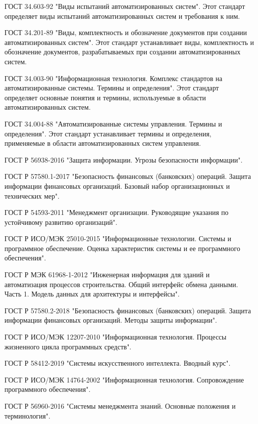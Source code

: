 ГОСТ 34.603-92 "Виды испытаний автоматизированных систем". Этот стандарт определяет виды испытаний автоматизированных систем и требования к ним.

ГОСТ 34.201-89 "Виды, комплектность и обозначение документов при создании автоматизированных систем". Этот стандарт устанавливает виды, комплектность и обозначение документов, разрабатываемых при создании автоматизированных систем.

ГОСТ 34.003-90 "Информационная технология. Комплекс стандартов на автоматизированные системы. Термины и определения". Этот стандарт определяет основные понятия и термины, используемые в области автоматизированных систем.

ГОСТ 34.004-88 "Автоматизированные системы управления. Термины и определения". Этот стандарт устанавливает термины и определения, применяемые в области автоматизированных систем управления.

ГОСТ Р 56938-2016 "Защита информации. Угрозы безопасности информации".

ГОСТ Р 57580.1-2017 "Безопасность финансовых (банковских) операций. Защита информации финансовых организаций. Базовый набор организационных и технических мер".

ГОСТ Р 54593-2011 "Менеджмент организации. Руководящие указания по устойчивому развитию организаций".

ГОСТ Р ИСО/МЭК 25010-2015 "Информационные технологии. Системы и программное обеспечение. Оценка характеристик системы и ее программного обеспечения".

ГОСТ Р МЭК 61968-1-2012 "Инженерная информация для зданий и автоматизация процессов строительства. Общий интерфейс обмена данными. Часть 1. Модель данных для архитектуры и интерфейсы".

ГОСТ Р 57580.2-2018 "Безопасность финансовых (банковских) операций. Защита информации финансовых организаций. Методы защиты информации".

ГОСТ Р ИСО/МЭК 12207-2010 "Информационная технология. Процессы жизненного цикла программных средств".

ГОСТ Р 58412-2019 "Системы искусственного интеллекта. Вводный курс".

ГОСТ Р ИСО/МЭК 14764-2002 "Информационная технология. Сопровождение программного обеспечения".

ГОСТ Р 56960-2016 "Системы менеджмента знаний. Основные положения и терминология".


\break


